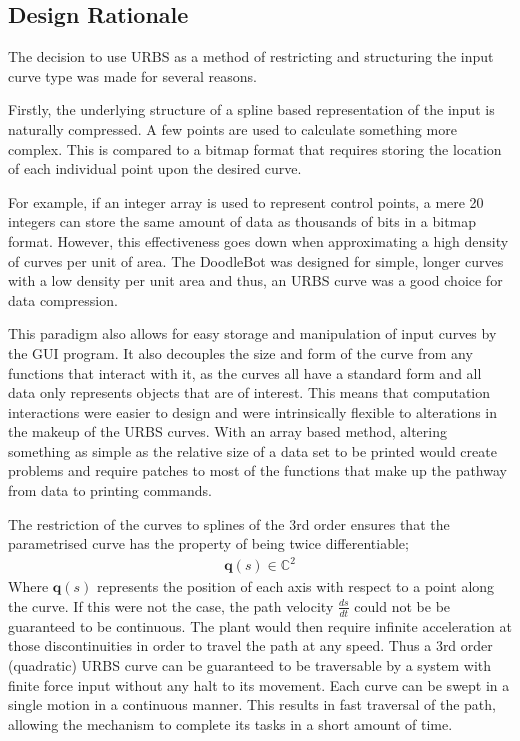 \subsection{Design Rationale}

The decision to use URBS as a method of restricting and structuring the input curve type was made for several reasons. 

Firstly, the underlying structure of a spline based representation of the input is naturally compressed. A few points are used to calculate something more complex. This is compared to a bitmap format that requires storing the location of each individual point upon the desired curve. 

For example, if an integer array is used to represent control points, a mere 20 integers can store the same amount of data as thousands of bits in a bitmap format. However, this effectiveness goes down when approximating a high density of curves per unit of area. The DoodleBot was designed for simple, longer curves with a low density per unit area and thus, an URBS curve was a good choice for data compression. 

This paradigm also allows for easy storage and manipulation of input curves by the GUI program. It also decouples the size and form of the curve from any functions that interact with it, as the curves all have a standard form and all data only represents objects that are of interest. This means that computation interactions were easier to design and were intrinsically flexible to alterations in the makeup of the URBS curves. With an array based method, altering something as simple as the relative size of a data set to be printed would create problems and require patches to most of the functions that make up the pathway from data to printing commands.

The restriction of the curves to splines of the 3rd order ensures that the parametrised curve has the property of being twice differentiable;
\begin{align*}
\textbf{q}(s) \in \mathbb{C}^2
\end{align*}
Where $\textbf{q}(s)$ represents the position of each axis with respect to a point along the curve.
If this were not the case, the path velocity $\frac{ds}{dt}$ could not be be guaranteed to be continuous. The plant would then require infinite acceleration at those discontinuities in order to travel the path at any speed. Thus a 3rd order (quadratic) URBS curve can be guaranteed to be traversable by a system with finite force input without any halt to its movement. Each curve can be swept in a single motion in a continuous manner. This results in fast traversal of the path, allowing the mechanism to complete its tasks in a short amount of time.

